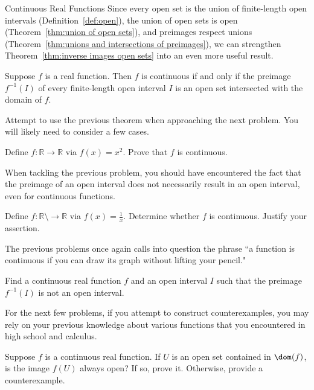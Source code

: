 \begin{section}{Continuous Real Functions}
Since every open set is the union of finite-length open intervals (Definition~\ref{def:open}), the union of open sets is open (Theorem~\ref{thm:union of open sets}), and preimages respect unions (Theorem~\ref{thm:unions and intersections of preimages}), we can strengthen Theorem~\ref{thm:inverse images open sets} into an even more useful result.  

\begin{theorem}\label{thm:inverse images basic open sets}
Suppose $f$ is a real function. Then $f$ is continuous if and only if the preimage $f^{-1}(I)$ of every finite-length open interval $I$ is an open set intersected with the domain of $f$.
\end{theorem}

Attempt to use the previous theorem when approaching the next problem.  You will likely need to consider a few cases. 

\begin{problem}
Define $f:\mathbb{R}\to\mathbb{R}$ via $f(x)=x^2$. Prove that $f$ is continuous.
\end{problem}

When tackling the previous problem, you should have encountered the fact that the preimage of an open interval does not necessarily result in an open interval, even for continuous functions.

\begin{problem}
Define $f:\mathbb{R}\setminus\to\mathbb{R}$ via $f(x)=\frac{1}{x}$. Determine whether $f$ is continuous. Justify your assertion.
\end{problem}

The previous problems once again calls into question the phrase ``a function is continuous if you can draw its graph without lifting your pencil."

\begin{problem}
Find a continuous real function $f$ and an open interval $I$ such that the preimage $f^{-1}(I)$ is not an open interval.
\end{problem}

For the next few problems, if you attempt to construct counterexamples, you may rely on your previous knowledge about various functions that you encountered in high school and calculus.

\begin{problem}
Suppose $f$ is a continuous real function. If $U$ is an open set contained in $\dom(f)$, is the image $f(U)$ always open?  If so, prove it.  Otherwise, provide a counterexample.
\end{problem}


\end{section}
